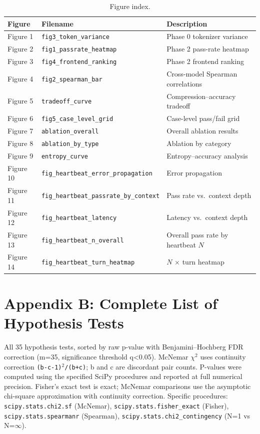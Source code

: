 \documentclass{article}
\begin{document}
\begin{table}[ht]
\centering
\footnotesize
\caption{Figure index.}
\begin{tabular}{p{1.2cm}p{7.5cm}p{4cm}}
\toprule
Figure & Filename & Description \\
\midrule
Figure 1 & \texttt{fig3\_token\_variance} & Phase 0 tokenizer variance \\
Figure 2 & \texttt{fig1\_passrate\_heatmap} & Phase 2 pass-rate heatmap \\
Figure 3 & \texttt{fig4\_frontend\_ranking} & Phase 2 frontend ranking \\
Figure 4 & \texttt{fig2\_spearman\_bar} & Cross-model Spearman correlations \\
Figure 5 & \texttt{tradeoff\_curve} & Compression--accuracy tradeoff \\
Figure 6 & \texttt{fig5\_case\_level\_grid} & Case-level pass/fail grid \\
Figure 7 & \texttt{ablation\_overall} & Overall ablation results \\
Figure 8 & \texttt{ablation\_by\_type} & Ablation by category \\
Figure 9 & \texttt{entropy\_curve} & Entropy--accuracy analysis \\
Figure 10 & \texttt{fig\_heartbeat\_error\_propagation} & Error propagation \\
Figure 11 & \texttt{fig\_heartbeat\_passrate\_by\_context} & Pass rate vs.~context depth \\
Figure 12 & \texttt{fig\_heartbeat\_latency} & Latency vs.~context depth \\
Figure 13 & \texttt{fig\_heartbeat\_n\_overall} & Overall pass rate by heartbeat $N$ \\
Figure 14 & \texttt{fig\_heartbeat\_turn\_heatmap} & $N$ $\times$ turn heatmap \\
\bottomrule
\end{tabular}
\end{table}


\section{Appendix B: Complete List of Hypothesis Tests}\label{appendix-b-complete-list-of-hypothesis-tests}



All 35 hypothesis tests, sorted by raw p-value with Benjamini--Hochberg FDR correction (m=35, significance threshold q\textless0.05). McNemar $\chi$$^{2}$ uses continuity correction \texttt{(\textbar{}b-c\textbar{}-1)$^{2}$/(b+c)}; b and c are discordant pair counts. P-values were computed using the specified SciPy procedures and reported at full numerical precision. Fisher's exact test is exact; McNemar comparisons use the asymptotic chi-square approximation with continuity correction. Specific procedures: \texttt{scipy.stats.chi2.sf} (McNemar), \texttt{scipy.stats.fisher\_exact} (Fisher), \texttt{scipy.stats.spearmanr} (Spearman), \texttt{scipy.stats.chi2\_contingency} (N=1 vs N=$\infty$).
\end{document}
